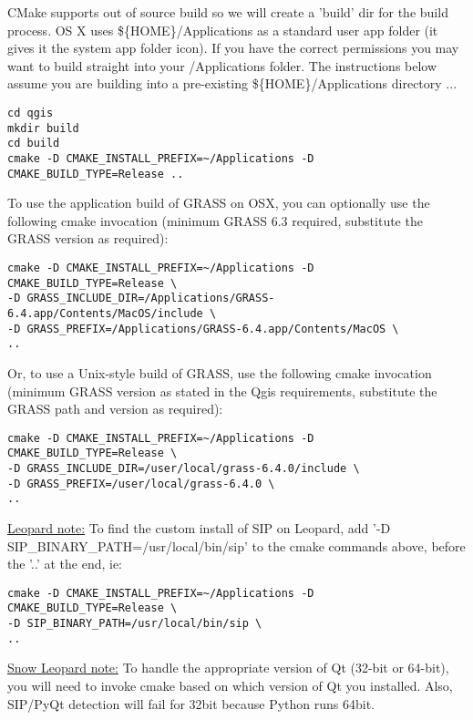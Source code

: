 CMake supports out of source build so we will create a 'build' dir for the
build process. OS X uses \$\{HOME\}/Applications as a standard user app folder (it gives it the system app folder icon).
If you have the correct permissions you may want to build
straight into your /Applications folder. The instructions below assume you are
building into a pre-existing \$\{HOME\}/Applications directory ...

\begin{verbatim}
cd qgis
mkdir build
cd build
cmake -D CMAKE_INSTALL_PREFIX=~/Applications -D CMAKE_BUILD_TYPE=Release ..
\end{verbatim}

To use the application build of GRASS on OSX, you can optionally use the
following cmake invocation (minimum GRASS 6.3 required, substitute the GRASS
version as required):

\begin{verbatim}
cmake -D CMAKE_INSTALL_PREFIX=~/Applications -D CMAKE_BUILD_TYPE=Release \
-D GRASS_INCLUDE_DIR=/Applications/GRASS-6.4.app/Contents/MacOS/include \
-D GRASS_PREFIX=/Applications/GRASS-6.4.app/Contents/MacOS \
..
\end{verbatim}

Or, to use a Unix-style build of GRASS, use the following cmake invocation
(minimum GRASS version as stated in the Qgis requirements, substitute the GRASS
path and version as required):

\begin{verbatim}
cmake -D CMAKE_INSTALL_PREFIX=~/Applications -D CMAKE_BUILD_TYPE=Release \
-D GRASS_INCLUDE_DIR=/user/local/grass-6.4.0/include \
-D GRASS_PREFIX=/user/local/grass-6.4.0 \
..
\end{verbatim}

\underline{Leopard note:} To find the custom install of SIP on Leopard, add
'-D SIP\_BINARY\_PATH=/usr/local/bin/sip' to the cmake commands above,
before the '..' at the end, ie:

\begin{verbatim}
cmake -D CMAKE_INSTALL_PREFIX=~/Applications -D CMAKE_BUILD_TYPE=Release \
-D SIP_BINARY_PATH=/usr/local/bin/sip \
..
\end{verbatim}

\underline{Snow Leopard note:} To handle the appropriate version of Qt (32-bit or 64-bit), you will need to invoke cmake based on which version of Qt you installed.  Also, SIP/PyQt detection will fail for 32bit because Python runs 64bit.

